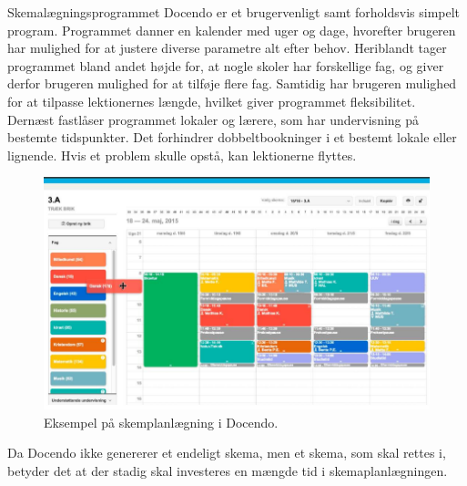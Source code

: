 Skemalægningsprogrammet Docendo er et brugervenligt samt forholdsvis simpelt program. Programmet  danner en kalender med uger og dage, hvorefter brugeren har mulighed for at justere diverse parametre alt efter behov. Heriblandt tager programmet bland andet højde for, at nogle skoler har forskellige fag, og giver derfor brugeren mulighed for at tilføje flere fag. Samtidig har brugeren mulighed for at tilpasse lektionernes længde, hvilket giver programmet fleksibilitet. Dernæst fastlåser programmet lokaler og lærere, som har undervisning på bestemte tidspunkter. Det forhindrer dobbeltbookninger i et bestemt lokale eller lignende. Hvis et problem skulle opstå, kan lektionerne flyttes.
\begin{figure}[!h]
  \centering
  \includegraphics[width=\textwidth]{partials/graphics/docendo.png}
    \caption{Eksempel på skemplanlægning i Docendo.}
  \label{fig:docendo}
\end{figure}

Da Docendo ikke genererer et endeligt skema, men et skema, som skal rettes i, betyder det at der stadig skal investeres en mængde tid i skemaplanlægningen.